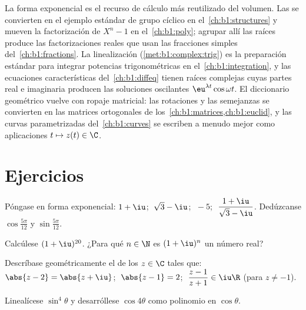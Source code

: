 \begin{remark}\label{rem:b1:complex:whereused}
La forma exponencial es el recurso de cálculo más reutilizado del
volumen. Las  se convierten en el ejemplo estándar
de grupo cíclico en el~\cref{ch:b1:structures} y mueven la
factorización de $X^n - 1$ en el~\cref{ch:b1:poly}; agrupar allí las
raíces  produce las factorizaciones reales que usan las
fracciones simples del~\cref{ch:b1:fractions}. La linealización
(\cref{met:b1:complex:trig}) es la preparación estándar para integrar
potencias trigonométricas en el~\cref{ch:b1:integration}, y las
ecuaciones características del~\cref{ch:b1:diffeq} tienen raíces
complejas cuyas partes real e imaginaria producen las soluciones
oscilantes $\eu^{\lambda t}\cos\omega t$. El diccionario geométrico
vuelve con ropaje matricial: las rotaciones y las semejanzas se
convierten en las matrices ortogonales de
los~\cref{ch:b1:matrices,ch:b1:euclid}, y las curvas parametrizadas
del~\cref{ch:b1:curves} se escriben a menudo mejor como aplicaciones
$t \mapsto z(t) \in \C$.
\end{remark}

\section{Ejercicios}

\begin{exercise}[$\star$]\label{exo:b1:complex:1}
Póngase en forma exponencial: $1 + \iu$; $\;\sqrt 3 - \iu$; $\;-5$;
$\;\dfrac{1 + \iu}{\sqrt 3 - \iu}$. Dedúzcanse
$\cos\frac{5\pi}{12}$ y $\sin\frac{5\pi}{12}$.
\end{exercise}

\begin{exercise}[$\star$]\label{exo:b1:complex:2}
Calcúlese $(1 + \iu)^{20}$. ¿Para qué $n \in \N$ es $(1 + \iu)^n$ un
número real?
\end{exercise}

\begin{exercise}[$\star$]\label{exo:b1:complex:3}
Descríbase geométricamente el  de los $z \in \C$ tales que:
$\abs{z - 2} = \abs{z + \iu}$; $\;\abs{z - 1} = 2$;
$\;\dfrac{z - 1}{z + 1} \in \iu\R$ (para $z \neq -1$).
\end{exercise}

\begin{exercise}[$\star$]\label{exo:b1:complex:4}
Linealícese $\sin^4\theta$ y desarróllese $\cos 4\theta$ como polinomio
en $\cos\theta$.
\end{exercise}

